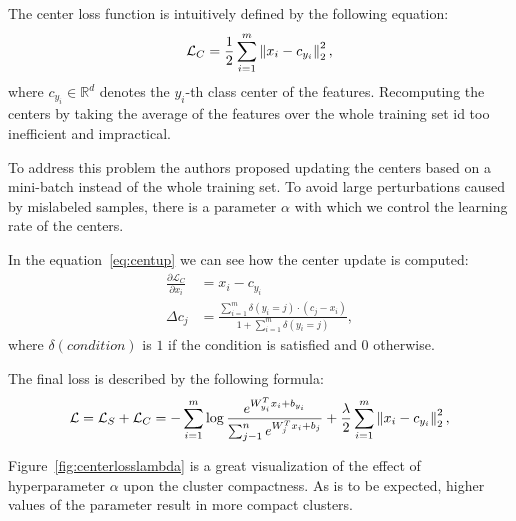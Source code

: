 The center loss function is intuitively defined by the following equation:
\begin{equation}
    \label{eq:center}
    \mathcal{L}_C = \frac{1}{2} \sum_{i=1}^{m} \left\lVert x_i - c_{y_i}\right\rVert_2^2,
\end{equation}
where $c_{y_i} \in \mathbb{R}^{d}$ denotes the $y_i$-th class center of the features.
Recomputing the centers by taking the average of the features over the whole training set id too inefficient and
impractical.

To address this problem the authors proposed updating the centers based on a mini-batch instead of the whole training
set.
To avoid large perturbations caused by mislabeled samples, there is a parameter $\alpha$ with which we control the
learning rate of the centers.

In the equation~\ref{eq:centup} we can see how the center update is computed:
\begin{align}
    \frac{\partial \mathcal{L}_C}{\partial x_i} &= x_i - c_{y_i} \\
    \Delta c_j &= \frac{\sum_{i=1}^m \delta(y_i=j) \cdot (c_j-x_i)}{1+\sum_{i=1}^m \delta(y_i=j)}, \label{eq:centup}
\end{align}
where $\delta(condition)$ is $1$ if the condition is satisfied and $0$ otherwise.

The final loss is described by the following formula:
\begin{equation}
    \label{eq:centerloss}
    \mathcal{L} = \mathcal{L}_S + \mathcal{L}_C = -\sum_{i=1}^{m} \log \frac{e^{W^T_{y_i} x_{i} + b_{y_i}}}
    {\sum_{j-1}^{n} e^{W^T_{j} x_{i} + b_{j}}} + \frac{\lambda}{2} \sum_{i=1}^{m} \left\lVert x_i - c_{y_i}\right\rVert_2^2,
\end{equation}

Figure~\ref{fig:centerlosslambda} is a great visualization of the effect of hyperparameter $\alpha$ upon the cluster
compactness.
As is to be expected, higher values of the parameter result in more compact clusters.

